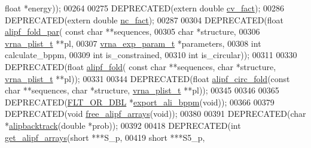 \begin{DoxyCode}
{      float} *energy));
00264 
00275 DEPRECATED(\textcolor{keyword}{extern}  \textcolor{keywordtype}{double}  \hyperlink{group__consensus__fold_gaf3cbac6ff5d706d6e414677841ddf94c}{cv\_fact});
00286 DEPRECATED(\textcolor{keyword}{extern}  \textcolor{keywordtype}{double}  \hyperlink{group__consensus__fold_ga502948a122a2af5b914355b1f3ea2f61}{nc\_fact});
00287 
00304 DEPRECATED(\textcolor{keywordtype}{float} \hyperlink{group__consensus__pf__fold_ga5e8d54e41bf3d5b6e535d5bdb33c416e}{alipf\_fold\_par}( \textcolor{keyword}{const} \textcolor{keywordtype}{char} **sequences,
00305                       \textcolor{keywordtype}{char} *structure,
00306                       \hyperlink{group__data__structures_structvrna__plist__s}{vrna\_plist\_t} **pl,
00307                       \hyperlink{group__energy__parameters_structvrna__exp__param__s}{vrna\_exp\_param\_t} *parameters,
00308                       \textcolor{keywordtype}{int} calculate\_bppm,
00309                       \textcolor{keywordtype}{int} is\_constrained,
00310                       \textcolor{keywordtype}{int} is\_circular));
00311 
00330 DEPRECATED(\textcolor{keywordtype}{float} \hyperlink{group__consensus__pf__fold_gaa150d3ba7b009a1c27cb6f0eb197f6b4}{alipf\_fold}( \textcolor{keyword}{const} \textcolor{keywordtype}{char} **sequences, \textcolor{keywordtype}{char} *structure, 
      \hyperlink{group__data__structures_structvrna__plist__s}{vrna\_plist\_t} **pl));
00331 
00344 DEPRECATED(\textcolor{keywordtype}{float} \hyperlink{group__consensus__pf__fold_gaadd8d570442f86cbbc4978c8c62c9646}{alipf\_circ\_fold}(\textcolor{keyword}{const} \textcolor{keywordtype}{char} **sequences, \textcolor{keywordtype}{char} *structure, 
      \hyperlink{group__data__structures_structvrna__plist__s}{vrna\_plist\_t} **pl));
00345 
00346 
00365 DEPRECATED(\hyperlink{group__data__structures_ga31125aeace516926bf7f251f759b6126}{FLT\_OR\_DBL} *\hyperlink{group__consensus__pf__fold_ga11b6ab8bd9be1821fea352b190a01cab}{export\_ali\_bppm}(\textcolor{keywordtype}{void}));
00366 
00379 DEPRECATED(\textcolor{keywordtype}{void}  \hyperlink{group__consensus__pf__fold_ga0c0498f35686e26b38ee460d3db1a661}{free\_alipf\_arrays}(\textcolor{keywordtype}{void}));
00380 
00391 DEPRECATED(\textcolor{keywordtype}{char}  *\hyperlink{group__consensus__stochbt_ga0df40248788f0fb17ebdc59d74116d1c}{alipbacktrack}(\textcolor{keywordtype}{double} *prob));
00392 
00418 DEPRECATED(\textcolor{keywordtype}{int} \hyperlink{group__consensus__fold_ga5349960075b1847720a2e9df021e2675}{get\_alipf\_arrays}(\textcolor{keywordtype}{short} ***S\_p,
00419                      \textcolor{keywordtype}{short} ***S5\_p,

\end{DoxyCode}
